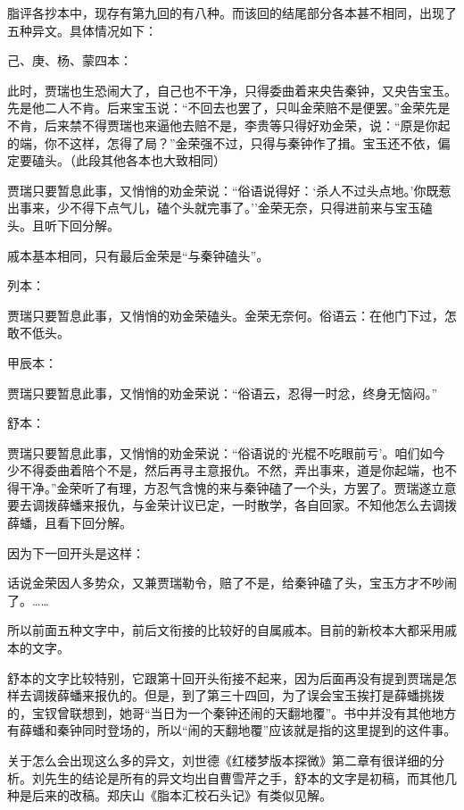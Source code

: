 \href{../Text/part0088.html\#navto_2_a}{}

{{}}

脂评各抄本中，现存有第九回的有八种。而该回的结尾部分各本甚不相同，出现了五种异文。具体情况如下：

己、庚、杨、蒙四本：

此时，贾瑞也生恐闹大了，自己也不干净，只得委曲着来央告秦钟，又央告宝玉。先是他二人不肯。后来宝玉说：``不回去也罢了，只叫金荣赔不是便罢。''金荣先是不肯，后来禁不得贾瑞也来逼他去赔不是，李贵等只得好劝金荣，说：``原是你起的端，你不这样，怎得了局？''金荣强不过，只得与秦钟作了揖。宝玉还不依，偏定要磕头。{（此段其他各本也大致相同）}

贾瑞只要暂息此事，又悄悄的劝金荣说：``俗语说得好：`杀人不过头点地。'你既惹出事来，少不得下点气儿，磕个头就完事了。''金荣无奈，只得进前来与宝玉磕头。且听下回分解。

戚本基本相同，只有最后金荣是``与秦钟磕头''。

列本：

贾瑞只要暂息此事，又悄悄的劝金荣磕头。金荣无奈何。俗语云：在他门下过，怎敢不低头。

甲辰本：

贾瑞只要暂息此事，又悄悄的劝金荣说：``俗语云，忍得一时忿，终身无恼闷。''

舒本：

贾瑞只要暂息此事，又悄悄的劝金荣说：``俗语说的`光棍不吃眼前亏'。咱们如今少不得委曲着陪个不是，然后再寻主意报仇。不然，弄出事来，道是你起端，也不得干净。''金荣听了有理，方忍气含愧的来与秦钟磕了一个头，方罢了。贾瑞遂立意要去调拨薛蟠来报仇，与金荣计议已定，一时散学，各自回家。不知他怎么去调拨薛蟠，且看下回分解。

因为下一回开头是这样：

话说金荣因人多势众，又兼贾瑞勒令，赔了不是，给秦钟磕了头，宝玉方才不吵闹了。\ldots{}\ldots{}

所以前面五种文字中，前后文衔接的比较好的自属戚本。目前的新校本大都采用戚本的文字。

舒本的文字比较特别，它跟第十回开头衔接不起来，因为后面再没有提到贾瑞是怎样去调拨薛蟠来报仇的。但是，到了第三十四回，为了误会宝玉挨打是薛蟠挑拨的，宝钗曾联想到，她哥``当日为一个秦钟还闹的天翻地覆''。书中并没有其他地方有薛蟠和秦钟同时登场的，所以``闹的天翻地覆''应该就是指的这里提到的这件事。

关于怎么会出现这么多的异文，刘世德《红楼梦版本探微》第二章有很详细的分析。刘先生的结论是所有的异文均出自曹雪芹之手，舒本的文字是初稿，而其他几种是后来的改稿。郑庆山《脂本汇校石头记》有类似见解。

